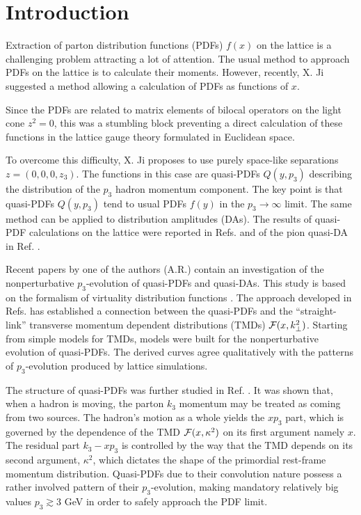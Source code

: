 \section{ Introduction}


Extraction of  parton distribution functions (PDFs) $f(x)$ \cite{Feynman:1973xc}
on the lattice is a challenging problem attracting a lot of attention.
 The usual  method to approach PDFs on the lattice  is to calculate  their moments.
  However, recently, X. Ji  \cite{Ji:2013dva} suggested a method
 allowing a calculation  of  PDFs   as  functions of $x$.

 Since the PDFs
are  related to   matrix elements
of bilocal operators on   the light cone $z^2=0$, this was a stumbling block preventing
a  direct  calculation of these functions in  the   lattice
 gauge  theory
 formulated in  Euclidean space.

  To overcome this difficulty, X. Ji proposes to use purely space-like
separations $z=(0,0,0,z_3)$.
The functions in this case are   quasi-PDFs  $Q(y,p_3)$ describing the distribution
of   the $p_3$  hadron  momentum  component.
The key point is that quasi-PDFs $Q(y,p_3)$
   tend to  usual PDFs $f(y)$
     in the \mbox{$p_3 \to \infty$}  limit.
     The same method can be applied to distribution amplitudes (DAs).
The results of  quasi-PDF calculations on the  lattice
   were reported
in Refs.  \cite{Lin:2014zya,Chen:2016utp,Alexandrou:2015rja}
and of the pion quasi-DA   in Ref. \cite{Zhang:2017bzy}.



Recent papers \cite{Radyushkin:2016hsy,Radyushkin:2017gjd}
by one of the authors (A.R.) contain an investigation of the  nonperturbative $p_3$-evolution of
quasi-PDFs and quasi-DAs. This study  is based on
 the formalism of  virtuality distribution functions
 \cite{Radyushkin:2014vla,Radyushkin:2015gpa}.
 The approach developed in Refs.
 \cite{Radyushkin:2016hsy,Radyushkin:2017gjd}  has  established  a connection between
the   quasi-PDFs  and
  the   ``straight-link'' transverse momentum dependent
 distributions    (TMDs) ${\cal F} (x, k_\perp^2)$.
 Starting  from  simple models for TMDs,  models were
 built  for the    nonperturbative evolution of
quasi-PDFs.  The derived curves agree qualitatively with the patterns of
\mbox{$p_3$-evolution}  produced by lattice simulations.

The structure  of quasi-PDFs was further studied in Ref.   \cite{Radyushkin:2017cyf}.
 It was   shown  that,
when a  hadron is moving, the parton $k_3$ momentum
may be treated  as
coming  from two sources. The hadron's motion as a whole yields
the  $xp_3$  part,  which is governed by the dependence of
 the TMD  ${\cal F} (x, \kappa^2)$ on its first argument namely $x$.
  The residual part $k_3-xp_3$
is controlled by the  way that the TMD depends on its second argument,
$\kappa^2$,
which dictates the shape of the primordial
 rest-frame
 momentum distribution.    Quasi-PDFs due to their convolution nature possess a rather  involved pattern of their
 \mbox{$p_3$-evolution,} making mandatory relatively big values $p_3 \gtrsim 3$ GeV in order to safely approach the PDF limit.

